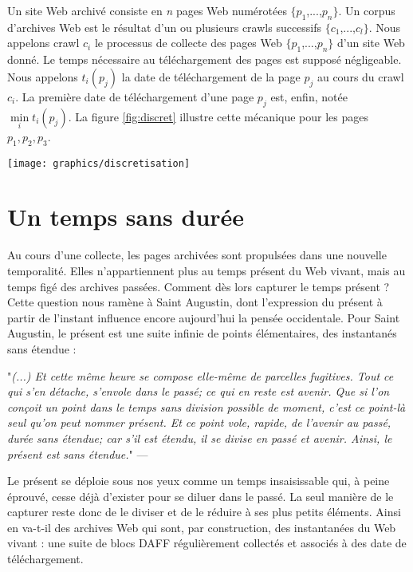 \documentclass[symmetric,justified,marginals=raggedouter]{tufte-book}
\begin{document}
Un site Web archivé consiste en \textit{n} pages Web numérotées $\{p_1$,...,$p_n\}$. Un corpus d'archives Web est le résultat d'un ou plusieurs crawls successifs $\{c_1$,...,$c_l\}$. Nous appelons crawl $c_i$ le processus de collecte des pages Web $\{p_1$,...,$p_n\}$ d'un site Web donné. Le temps nécessaire au téléchargement des pages est supposé négligeable. Nous appelons $t_i(p_j)$ la date de téléchargement de la page $p_j$ au cours du crawl $c_i$. La première date de téléchargement d'une page $p_j$ est, enfin, notée $\min\limits_{i} t_i(p_j)$. La figure \ref{fig:discret} illustre cette mécanique pour les pages $p_1, p_2, p_3$. 

\begin{figure*}%
  \texttt{[image: graphics/discretisation]}
  \caption{Archivage des pages $p_1, p_2, p_3$ au cours du crawl $c_i$}
  \label{fig:discret}
\end{figure*}

\section{Un temps sans durée}
\label{sec:4_temporalite}

\noindent Au cours d'une collecte, les pages archivées sont propulsées dans une nouvelle temporalité. Elles n'ap\-partiennent plus au temps présent du Web vivant, mais au temps figé des archives passées. Comment dès lors capturer le temps présent ? Cette question nous ramène à Saint Augustin, dont l'expression du  présent à partir de l'instant influence encore aujourd'hui la pensée occidentale. Pour Saint Augustin, le présent est une suite infinie de points élémentaires, des instantanés sans étendue :\\ 

\begin{fullwidth}
"\textit{(...) Et cette même heure se compose elle-même de parcelles fugitives. Tout ce qui s'en détache, s'envole dans le passé; ce qui en reste est avenir. Que si l'on conçoit un point dans le temps sans division possible de moment, c'est ce point-là seul qu'on peut nommer présent. Et ce point vole, rapide, de l'avenir au passé, durée sans étendue; car s'il est étendu, il se divise en passé et avenir. Ainsi, le présent est sans étendue.}" ---  \citep[livre XI, chap. XV, 20, p.~195]{saint_augustin_confessions_1993}\\
\end{fullwidth}

\noindent Le présent se déploie sous nos yeux comme un temps insaisissable qui, à peine éprouvé, cesse déjà d'exister pour se diluer dans le passé. La seul manière de le capturer reste donc de le diviser et de le réduire à ses plus petits éléments. Ainsi en va-t-il des archives Web qui sont, par construction, des instantanées du Web vivant : une suite de blocs DAFF régulièrement collectés et associés à des date de téléchargement. 
\end{document}
